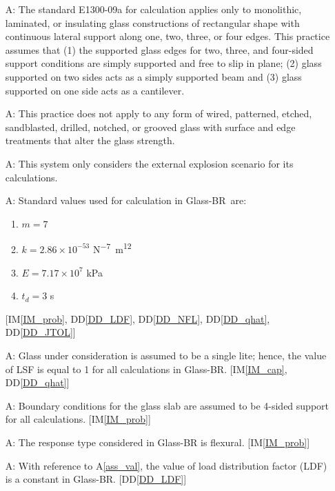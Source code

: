 \documentclass[12pt]{article}
\newcommand{\ddref}[1]{DD\ref{#1}}
\newcounter{assumpnum} %
\newcommand{\iref}[1]{IM\ref{#1}}
\newcommand{\progname}{Glass-BR}
\begin{document}
\begin{enumerate}

\item[A\refstepcounter{assumpnum}\theassumpnum \label{A_Glass}:] The standard E1300-09a for
  calculation applies only to monolithic, laminated, or insulating glass
  constructions of rectangular shape with continuous lateral support along one,
  two, three, or four edges.  This practice assumes that (1) the supported glass
  edges for two, three, and four-sided support conditions are simply supported
  and free to slip in plane; (2) glass supported on two sides acts as a simply
  supported beam and (3) glass supported on one side acts as a cantilever.

\item[A\refstepcounter{assumpnum}\theassumpnum \label{A_N/AGlass}:] This practice does not apply to
  any form of wired, patterned, etched, sandblasted, drilled, notched, or grooved
  glass with surface and edge treatments that alter the glass strength.

\item [A\refstepcounter{assumpnum}\theassumpnum \label{A_External}:] This system
  only considers the external explosion scenario for its calculations.

\item[A\refstepcounter{assumpnum}\theassumpnum \label{ass_val}:] Standard values
  used for calculation in \progname\ are:

   \begin{enumerate}
   \item $m=7$
   \item $k=2.86 \times 10^{-53}$ \si{\newton^{-7}\meter^{12}}
   \item $E=7.17 \times 10^7$ \si{\kilo\pascal}
   \item $t_d=3$ \si{\second}
   \end{enumerate}
[\iref{IM_prob}, \ddref{DD_LDF}, \ddref{DD_NFL}, \ddref{DD_qhat}, \ddref{DD_JTOL}]

\item[A\refstepcounter{assumpnum}\theassumpnum \label{A_LSF}:] Glass under
  consideration is assumed to be a single lite; hence, the value of LSF is equal
  to 1 for all calculations in \progname.  [\iref{IM_cap}, \ddref{DD_qhat}]

\item[A\refstepcounter{assumpnum}\theassumpnum \label{A_BC}:] Boundary
  conditions for the glass slab are assumed to be 4-sided support for all
  calculations.  [\iref{IM_prob}]

 \item[A\refstepcounter{assumpnum}\theassumpnum \label{A_Flex}:] The response
   type considered in \progname{} is flexural.  [\iref{IM_prob}]

 \item[A\refstepcounter{assumpnum}\theassumpnum \label{A_LDF}:] With reference
   to A\ref{ass_val}, the value of load distribution factor (LDF) is a constant
   in \progname.  [\ddref{DD_LDF}]

\end{enumerate}
\end{document}
